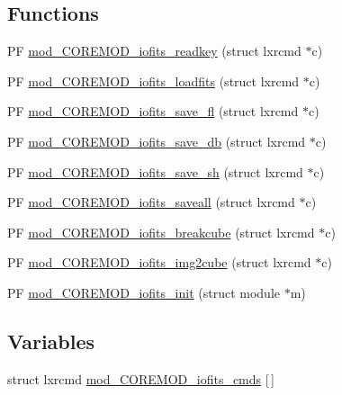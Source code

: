 \subsection*{Functions}
\begin{DoxyCompactItemize}
\item 
P\+F \hyperlink{PIAACMCdesign_2src_2COREMOD__iofits_2COREMOD__iofits-util_8c_aeb9dca3f78d29aea5c3a6995ec867ad0}{mod\+\_\+\+C\+O\+R\+E\+M\+O\+D\+\_\+iofits\+\_\+readkey} (struct lxrcmd $\ast$c)
\item 
P\+F \hyperlink{PIAACMCdesign_2src_2COREMOD__iofits_2COREMOD__iofits-util_8c_a625ce3b17195d8e08f4319e4a6cac82d}{mod\+\_\+\+C\+O\+R\+E\+M\+O\+D\+\_\+iofits\+\_\+loadfits} (struct lxrcmd $\ast$c)
\item 
P\+F \hyperlink{PIAACMCdesign_2src_2COREMOD__iofits_2COREMOD__iofits-util_8c_afa228e6c874d72f2e486870e0f27a76a}{mod\+\_\+\+C\+O\+R\+E\+M\+O\+D\+\_\+iofits\+\_\+save\+\_\+fl} (struct lxrcmd $\ast$c)
\item 
P\+F \hyperlink{PIAACMCdesign_2src_2COREMOD__iofits_2COREMOD__iofits-util_8c_a3402a7c6e69aeae45f321efec080c91a}{mod\+\_\+\+C\+O\+R\+E\+M\+O\+D\+\_\+iofits\+\_\+save\+\_\+db} (struct lxrcmd $\ast$c)
\item 
P\+F \hyperlink{PIAACMCdesign_2src_2COREMOD__iofits_2COREMOD__iofits-util_8c_a24e6f737b66283cfc8d8a2fa2e109e9c}{mod\+\_\+\+C\+O\+R\+E\+M\+O\+D\+\_\+iofits\+\_\+save\+\_\+sh} (struct lxrcmd $\ast$c)
\item 
P\+F \hyperlink{PIAACMCdesign_2src_2COREMOD__iofits_2COREMOD__iofits-util_8c_a9edb0bb8746624d5e245d460f334e3ec}{mod\+\_\+\+C\+O\+R\+E\+M\+O\+D\+\_\+iofits\+\_\+saveall} (struct lxrcmd $\ast$c)
\item 
P\+F \hyperlink{PIAACMCdesign_2src_2COREMOD__iofits_2COREMOD__iofits-util_8c_a651d22cbf69a99c25e305e370a5fed25}{mod\+\_\+\+C\+O\+R\+E\+M\+O\+D\+\_\+iofits\+\_\+breakcube} (struct lxrcmd $\ast$c)
\item 
P\+F \hyperlink{PIAACMCdesign_2src_2COREMOD__iofits_2COREMOD__iofits-util_8c_a3b242840565361a6f520bab50325e4f5}{mod\+\_\+\+C\+O\+R\+E\+M\+O\+D\+\_\+iofits\+\_\+img2cube} (struct lxrcmd $\ast$c)
\item 
P\+F \hyperlink{PIAACMCdesign_2src_2COREMOD__iofits_2COREMOD__iofits-util_8c_a41c5c637eb88eb38eff072058b58e0e5}{mod\+\_\+\+C\+O\+R\+E\+M\+O\+D\+\_\+iofits\+\_\+init} (struct module $\ast$m)
\end{DoxyCompactItemize}
\subsection*{Variables}
\begin{DoxyCompactItemize}
\item 
struct lxrcmd \hyperlink{PIAACMCdesign_2src_2COREMOD__iofits_2COREMOD__iofits-util_8c_a0a7c7f77e6eb17b31ea6125fdbf5dbe5}{mod\+\_\+\+C\+O\+R\+E\+M\+O\+D\+\_\+iofits\+\_\+cmds} \mbox{[}$\,$\mbox{]}
\end{DoxyCompactItemize}


